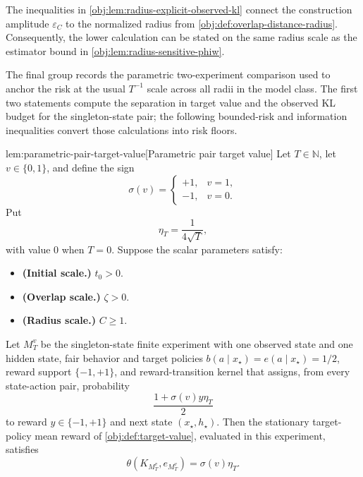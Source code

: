 \documentclass[11pt]{article}
\begin{document}
The inequalities in \cref{obj:lem:radius-explicit-observed-kl} connect the construction amplitude \(\varepsilon_C\) to the normalized radius from \cref{obj:def:overlap-distance-radius}. Consequently, the lower calculation can be stated on the same radius scale as the estimator bound in \cref{obj:lem:radius-sensitive-phiw}.

The final group records the parametric two-experiment comparison used to anchor the risk at the usual \(T^{-1}\) scale across all radii in the model class. The first two statements compute the separation in target value and the observed KL budget for the singleton-state pair; the following bounded-risk and information inequalities convert those calculations into risk floors.

\begin{lemmav}{lem:parametric-pair-target-value}[Parametric pair target value]
Let \(T\in\mathbb N\), let \(v\in\{0,1\}\), and define the sign
\[
\sigma(v)=
\begin{cases}
+1, & v=1,\\
-1, & v=0.
\end{cases}
\]
Put
\[
\eta_T=\frac{1}{4\sqrt T},
\]
with value \(0\) when \(T=0\). Suppose the scalar parameters satisfy:
\begin{itemize}
\item \textbf{(Initial scale.)} \(t_0>0\).
\item \textbf{(Overlap scale.)} \(\zeta>0\).
\item \textbf{(Radius scale.)} \(C\ge 1\).
\end{itemize}
Let \(M_T^v\) be the singleton-state finite experiment with one observed state and one hidden state, fair behavior and target policies \(b(a\mid x_\star)=e(a\mid x_\star)=1/2\), reward support \(\{-1,+1\}\), and reward-transition kernel that assigns, from every state-action pair, probability
\[
\frac{1+\sigma(v)y\eta_T}{2}
\]
to reward \(y\in\{-1,+1\}\) and next state \((x_\star,h_\star)\). Then the stationary target-policy mean reward of \cref{obj:def:target-value}, evaluated in this experiment, satisfies
\[
\theta(K_{M_T^v},e_{M_T^v})=\sigma(v)\eta_T .
\]
\end{lemmav}
\end{document}
